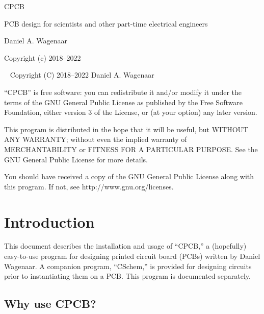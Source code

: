 \documentclass[11pt]{report}
\begin{document}
\thispagestyle{empty}
\begin{centering}
  {\Huge CPCB}
  \vskip30pt

  {\large PCB design for scientists and other part-time electrical engineers}
  \vskip60pt

  {\large Daniel A. Wagenaar}
  \vfill
  
  {Copyright (c) 2018--2022}
  
\end{centering}
\pagebreak
~
\vfill
\noindent Copyright (C) 2018--2022 Daniel A. Wagenaar\medskip

``CPCB'' is free software: you can redistribute it and/or modify
it under the terms of the GNU General Public License as published by
the Free Software Foundation, either version 3 of the License, or
(at your option) any later version.

This program is distributed in the hope that it will be useful,
but WITHOUT ANY WARRANTY; without even the implied warranty of
MERCHANTABILITY or FITNESS FOR A PARTICULAR PURPOSE.  See the
GNU General Public License for more details.

You should have received a copy of the GNU General Public License
along with this program.  If not, see http://www.gnu.org/licenses.
\pagebreak

\chapter{Introduction}

This document describes the installation and usage of ``CPCB,'' a
(hopefully) easy-to-use program for designing printed circuit board
(PCBs) written by Daniel Wagenaar. A companion program, ``CSchem,'' is
provided for designing circuits prior to instantiating them on a
PCB. This program is documented separately.

\section{Why use CPCB?}
\end{document}
